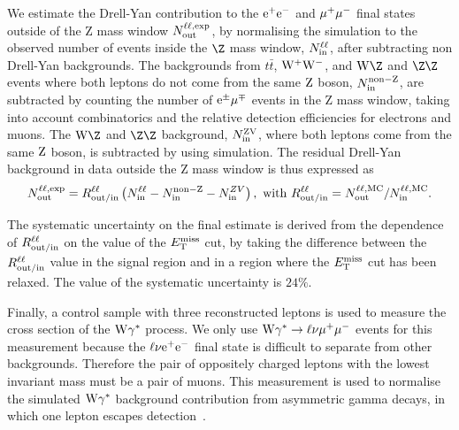 We estimate the Drell-Yan contribution to the $\mathrm{\mathrm{e}}^{+}\mathrm{\mathrm{e}}^{-}$ and
$\mu^{+}\mu^{-}$ final states outside of the Z mass window
$N_{\rm out}^{\ell\ell,{\rm exp}}$, by normalising the 
simulation to the observed number of events inside the $\Z$ mass window, 
$N_{\rm in}^{\ell\ell}$, after subtracting non Drell-Yan backgrounds. 
The backgrounds from $t\bar{t}$, $\mathrm{W}^+\mathrm{W}^-$, and $\WZ$ and $\ZZ$ events where both
leptons do not come from the same $\rm Z$ boson, $N_{\rm in}^{\rm{non-Z}}$,
are subtracted by counting the number of $\mathrm{\mathrm{e}}^{\pm}\mu^{\mp}$ events in the Z mass window, 
taking into account combinatorics and 
the relative detection efficiencies for electrons and muons.
The $\WZ$ and $\ZZ$ background, $N_{\rm in}^{\rm ZV}$, 
where both leptons come from the same 
${\rm Z}$ boson, is subtracted by using simulation. 
The residual Drell-Yan background in data outside the Z mass window is thus expressed as
%
\begin{eqnarray*}
N_{\rm out}^{\ell\ell,{\rm exp}} = R^{\ell\ell}_{\rm out/in}\left(N_{\rm in}^{\ell\ell} - N_{\rm in}^{\rm{non-Z}} - N_{\rm in}^{ZV}\right),
~\mathrm{with}~R^{\ell\ell}_{\rm out/in} = N_{\rm out}^{\ell\ell,{\rm MC}}/N_{\rm in}^{\ell\ell,{\rm MC}}.
\label{eq:dyest}
\end{eqnarray*}

The systematic uncertainty on the final estimate is derived from the dependence
of $R^{\ell\ell}_{\rm out/in}$ on the value of the $E_\mathrm{T}^{\mathrm{miss}}$ cut, by taking
the difference between the $R^{\ell\ell}_{\rm out/in}$ value in the signal region and in a
region where the $E_\mathrm{T}^{\mathrm{miss}}$ cut has been relaxed.
The value of the systematic uncertainty is $24\%$.


Finally, a control sample with three reconstructed leptons is used to measure the 
cross section of the $\mathrm{W}\gamma^{*}$ process. 
We only use $\mathrm{W}\gamma^{*} \rightarrow \ell\nu\mu^{+}\mu^{-}$ events 
for this measurement because the $\ell\nu\mathrm{\mathrm{e}}^{+}\mathrm{\mathrm{e}}^{-}$ final state is difficult to
separate from other backgrounds. Therefore the pair of oppositely charged
leptons with the lowest invariant mass must be a pair of muons. This
measurement is used to normalise the simulated $\mathrm{W}\gamma^{*}$ background
contribution from asymmetric gamma decays, in which one lepton escapes
detection~\cite{wgammastart}.

